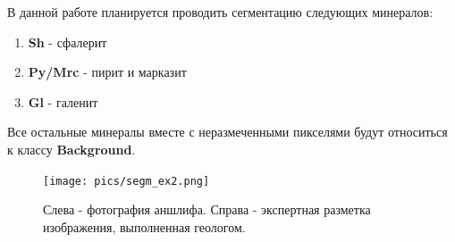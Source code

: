 \par
В данной работе планируется проводить сегментацию следующих минералов:
\begin{enumerate}[nosep]
    \item \textbf{Sh} - сфалерит
    \item \textbf{Py/Mrc} - пирит и марказит
    \item \textbf{Gl} - галенит
\end{enumerate}
Все остальные минералы вместе с неразмеченными пикселями будут относиться к классу \textbf{Background}.
\newline
\begin{figure}[H]
    \texttt{[image: pics/segm\_ex2.png]}
    \centering
    \caption{Слева - фотография аншлифа. Справа - экспертная разметка изображения, выполненная геологом.}
\end{figure}

\newpage
